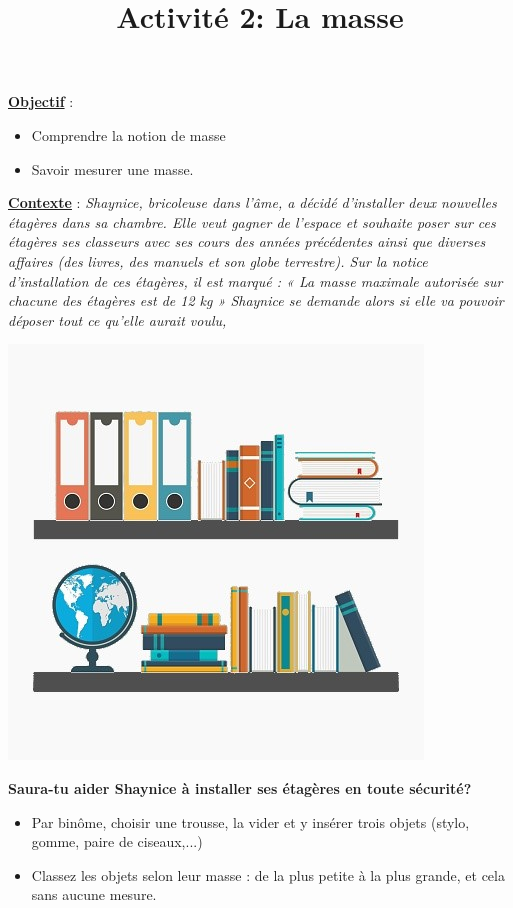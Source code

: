 \documentclass[10pt]{article}
\newcommand{\titreActivite}{Activité 2: La masse} %
\newcommand{\objectif}{ 	
	
	\begin{itemize}
		\item Comprendre la notion de masse
		\item Savoir mesurer une masse.
	\end{itemize}
} %
\newcommand{\contexte}{
	Shaynice, bricoleuse dans l’âme, a décidé d’installer deux nouvelles étagères
	dans sa chambre. Elle veut gagner de l’espace et souhaite poser sur ces
	étagères ses classeurs avec ses cours des années précédentes ainsi que
	diverses affaires (des livres, des manuels et son globe terrestre).
	Sur la notice d’installation de ces étagères, il est marqué :
	« La masse maximale autorisée sur chacune des étagères est de 12 kg »
	Shaynice se demande alors si elle va pouvoir déposer tout ce qu’elle aurait voulu, 
}
\newcommand{\resumeContexte}{
	Saura-tu aider Shaynice à installer ses étagères en toute sécurité?
	}
\begin{document}
\date{}
\title{\titreActivite}
\maketitle %


\underline{\textbf{Objectif}} :  \vspace{2pt}
\objectif

\vspace{4pt}

\underline{\textbf{Contexte}} :  \textit{\contexte}

\begin{center}
	\includegraphics[width=0.55\columnwidth]{assets/img-005.png} %
\end{center}

\textbf{\resumeContexte}
\vspace{-12pt}



\begin{question}
	\begin{itemize}
		\item Par binôme, choisir une trousse, la vider et y insérer trois objets (stylo, gomme, paire de ciseaux,...)
		\item Classez les objets selon leur masse : de la plus petite à la plus grande, et cela
		sans aucune mesure.
	\end{itemize}
\end{question}
\end{document}
